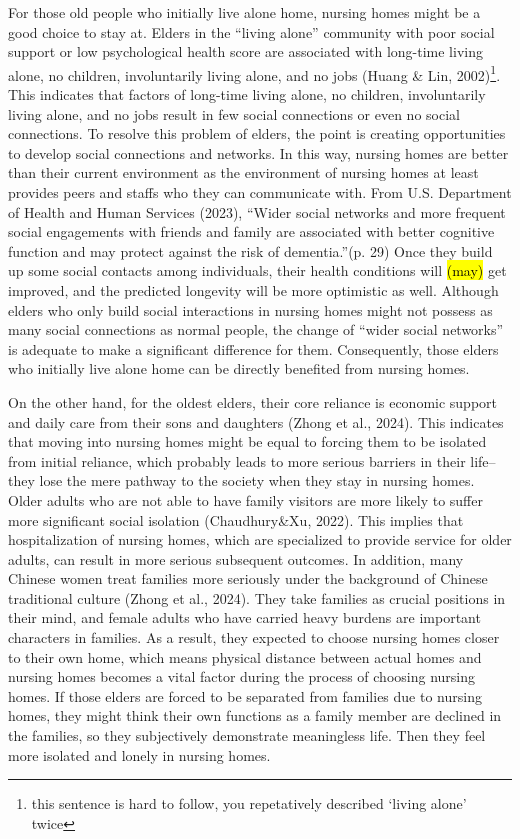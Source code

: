 \documentclass[12pt]{article}
\begin{document}
For those old people who initially live alone home, nursing homes might be a good choice to stay at. Elders in the “living alone” community with poor social support or low psychological health score are associated with long-time living alone, no children, involuntarily living alone, and no jobs (Huang \& Lin, 2002)\footnote{this sentence is hard to follow, you repetatively described `living alone' twice}. This indicates that factors of long-time living alone, no children, involuntarily living alone, and no jobs result in few social connections or even no social connections. To resolve this problem of elders, the point is creating opportunities to develop social connections and networks. In this way, nursing homes are better than their current environment as the environment of nursing homes at least provides peers and staffs who they can communicate with. From U.S. Department of Health and Human Services (2023), “Wider social networks and more frequent social engagements with friends and family are associated with better cognitive function and may protect against the risk of dementia.”(p. 29) Once they build up some social contacts among individuals, their health conditions will \hl{(may)} get improved, and the predicted longevity will be more optimistic as well. Although elders who only build social interactions in nursing homes might not possess as many social connections as normal people, the change of “wider social networks” is adequate to make a significant difference for them. Consequently, those elders who initially live alone home can be directly benefited from nursing homes.

On the other hand, for the oldest elders, their core reliance is economic support and daily care from their sons and daughters (Zhong et al., 2024). This indicates that moving into nursing homes might be equal to forcing them to be isolated from initial reliance, which probably leads to more serious barriers in their life--they lose the mere pathway to the society when they stay in nursing homes. Older adults who are not able to have family visitors are more likely to suffer more significant social isolation (Chaudhury\&Xu, 2022). This implies that hospitalization of nursing homes, which are specialized to provide service for older adults, can result in more serious subsequent outcomes. In addition, many Chinese women treat families more seriously under the background of Chinese traditional culture (Zhong et al., 2024). They take families as crucial positions in their mind, and female adults who have carried heavy burdens are important characters in families. As a result, they expected to choose nursing homes closer to their own home, which means physical distance between actual homes and nursing homes becomes a vital factor during the process of choosing nursing homes. If those elders are forced to be separated from families due to nursing homes, they might think their own functions as a family member are declined in the families, so they subjectively demonstrate meaningless life. Then they feel more isolated and lonely in nursing homes. 
\end{document}
